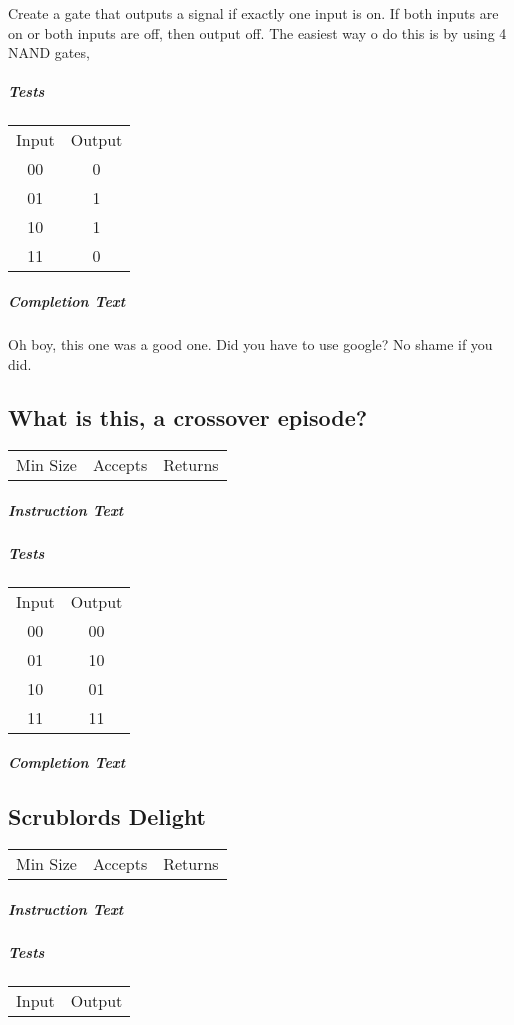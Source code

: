 \documentclass[a4paper, 12pt]{article}
\begin{document}
Create a gate that outputs a signal if exactly one input is on. If both inputs are on or both inputs are off, then output off. The easiest way o do this is by using 4 NAND gates, 
\subparagraph{Tests}
\begin{tabular}{cc}
	Input & Output \\
	00 & 0 \\
	01 & 1 \\
	10 & 1 \\
	11 & 0
\end{tabular}

\subparagraph{Completion Text}
Oh boy, this one was a good one. Did you have to use google? No shame if you did.

\subsection{What is this, a crossover episode?}
\begin{tabular}{ccc}
	Min Size & Accepts & Returns \\
	
\end{tabular}

\subparagraph{Instruction Text}

\subparagraph{Tests}
\begin{tabular}{cc}
	Input & Output \\
	00 & 00 \\
	01 & 10 \\
	10 & 01 \\
	11 & 11
\end{tabular}

\subparagraph{Completion Text}
\subsection{Scrublords Delight}
\begin{tabular}{ccc}
	Min Size & Accepts & Returns \\
	
\end{tabular}

\subparagraph{Instruction Text}

\subparagraph{Tests}
\begin{tabular}{cc}
	Input & Output \\
\end{tabular}
\end{document}
